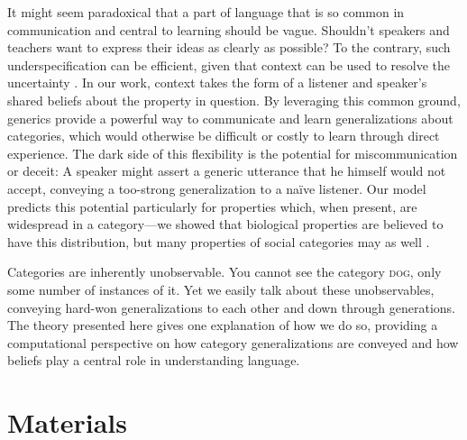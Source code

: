 \documentclass[10pt,letterpaper]{article}
\begin{document}


It might seem paradoxical that a part of language that is so common in communication and central to learning should be vague. 
Shouldn't speakers and teachers want to express their ideas as clearly as possible?
To the contrary, such underspecification can be efficient, given that context can be used to resolve the uncertainty \cite{Piantadosi2012}.
In our work, context takes the form of a listener and speaker's shared beliefs about the property in question. 
By leveraging this common ground, generics provide a powerful way to communicate and learn generalizations about categories, 
which would otherwise be difficult or costly to learn through direct experience.
The dark side of this flexibility is the potential for miscommunication or deceit: A speaker might assert a generic utterance that he himself would not accept, conveying a too-strong generalization to a na\"{i}ve listener.  
Our model predicts this potential particularly for properties which, when present, are widespread in a category---we showed that biological properties are believed to have this distribution, but many properties of social categories may as well \cite{Cimpian2011a,Cimpian2012b,Rhodes2012}.


Categories are inherently unobservable. 
You cannot see the category \textsc{dog}, only some number of instances of it.
Yet we easily talk about these unobservables, conveying hard-won generalizations to each other and down through generations.
The theory presented here gives one explanation of how we do so, providing a computational perspective on how category generalizations are conveyed and how beliefs play a central role in understanding language.






\section*{Materials}
\end{document}
